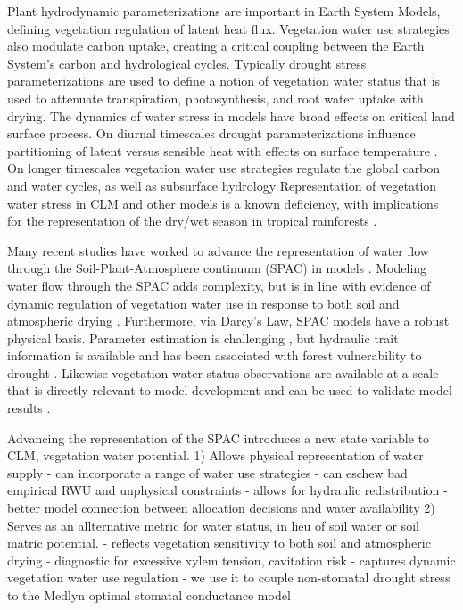 \documentclass[draft,linenumbers]{agujournal}
\begin{document}
Plant hydrodynamic parameterizations are important in Earth System Models, defining vegetation regulation of latent heat flux.
Vegetation water use strategies also modulate carbon uptake, creating a critical coupling between the Earth System's carbon and hydrological cycles.
Typically drought stress parameterizations are used to define a notion of vegetation water status 
that is used to attenuate transpiration, photosynthesis, and root water uptake with drying.
The dynamics of water stress in models have broad effects on critical land surface process.
On diurnal timescales drought parameterizations influence partitioning of latent versus sensible heat with effects on surface temperature \citep{bonan2014}.
On longer timescales vegetation water use strategies regulate the global carbon and water cycles, as well as subsurface hydrology \citep{dekauwe2015}
Representation of vegetation water stress in CLM and other models is a known deficiency, with implications for the representation of the dry/wet season in tropical rainforests \citep{powell2013,ukkola2016}.

Many recent studies have worked to advance the representation of water flow through the Soil-Plant-Atmosphere continuum (SPAC) in models \citep{xu2016,christoffersen2016,sperry2017}.
Modeling water flow through the SPAC adds complexity, but is in line with evidence of dynamic regulation of vegetation water use in response to both soil and atmospheric drying \citep{sperry2015}.
Furthermore, via Darcy's Law, SPAC models have a robust physical basis.
Parameter estimation is challenging \citep{drake2017}, but hydraulic trait information is available \citep{kattge2011,anderegg2015a} and has been associated with forest vulnerability to drought \citep{choat2012}.
Likewise vegetation water status observations are available at a scale that is directly relevant to model development \citep{konings2016,grant2016} and can be used to validate model results \citep{momen2017,konings2017b}.

Advancing the representation of the SPAC introduces a new state variable to CLM, vegetation water potential.
1) Allows physical representation of water supply
 - can incorporate a range of water use strategies
 - can eschew bad empirical RWU and unphysical constraints
 - allows for hydraulic redistribution
 - better model connection between allocation decisions and water availability
2) Serves as an allternative metric for water status, in lieu of soil water or soil matric potential.
 - reflects vegetation sensitivity to both soil and atmospheric drying
 - diagnostic for excessive xylem tension, cavitation risk
 - captures dynamic vegetation water use regulation
 - we use it to couple non-stomatal drought stress to the Medlyn optimal stomatal conductance model
\end{document}
